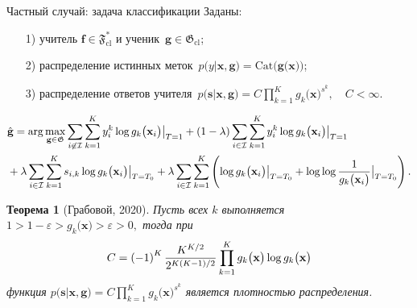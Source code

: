 \documentclass[10pt,pdf,hyperref={unicode}]{beamer}
\newtheorem{rustheorem}{Теорема}
\begin{document}
\begin{frame}{Частный случай: задача классификации}
\justifying
Заданы:
\begin{enumerate}
	\item[1)] учитель $\mathbf{f}\in\mathfrak{F}_{\text{cl}}^{*}$ и ученик~$\mathbf{g}\in\mathfrak{G}_{\text{cl}}$;
	\item[2)] распределение истинных меток~$p\bigr(y|\mathbf{x}, \mathbf{g}\bigr) = \text{Cat}\bigr(\mathbf{g}\bigr(\mathbf{x}\bigr)\bigr)$;
	\item[3)] распределение ответов учителя~$p\bigr(\mathbf{s}|\mathbf{x}, \mathbf{g}\bigr) = C\prod_{k=1}^{K}g_k\bigr(\mathbf{x}\bigr)^{s^k}, \quad C < \infty.$
\end{enumerate}
\[
\setlength\abovedisplayskip{0pt}
\begin{aligned}
&\hat{\mathbf{g}} = \arg\max_{\mathbf{g}\in \mathfrak{G}} \sum_{i\not\in \mathcal{I}}\sum_{k=1}^{K}y_i^k\log g_k\bigr(\mathbf{x}_i\bigr)\bigr|_{T=1} 
+ \left(1-\lambda\right)\sum_{i\in \mathcal{I}}\sum_{k=1}^{K}y_i^k\log g_k\bigr(\mathbf{x}_i\bigr)\bigr|_{T=1} \\
&+ \lambda\sum_{i\in \mathcal{I}}\sum_{k=1}^{K}s_{i,k}\log g_k\bigr(\mathbf{x}_i\bigr)\bigr|_{T=T_0} 
+ \lambda \sum_{i\in \mathcal{I}}\sum_{k=1}^{K}\left(\log g_k\bigr(\mathbf{x}_i\bigr)\bigr|_{T=T_0} + \log\log\frac{1}{g_k\bigr(\mathbf{x}_i\bigr)}\bigr|_{T=T_0}\right).
\end{aligned}
\setlength\belowdisplayskip{0pt}
\]

\begin{rustheorem}[Грабовой, 2020]
\label{theorem:st:dist}
Пусть всех $k$ выполняется $1 > 1- \varepsilon > g_k\bigr(\mathbf{x}\bigr) > \varepsilon > 0,$ тогда при
\[
\setlength\abovedisplayskip{0pt}
C=\left(-1\right)^{K}\frac{K^{K/2}}{2^{K(K-1)/2}}\prod_{k=1}^{K}g_k\bigr(\mathbf{x}\bigr)\log g_k\bigr(\mathbf{x}\bigr)
\setlength\belowdisplayskip{0pt}
\]
функция $p\bigr(\mathbf{s}|\mathbf{x}, \mathbf{g}\bigr) = C\prod_{k=1}^{K}g_k\bigr(\mathbf{x}\bigr)^{s^k}$ является плотностью распределения.
\end{rustheorem}

\end{frame}
\end{document}
